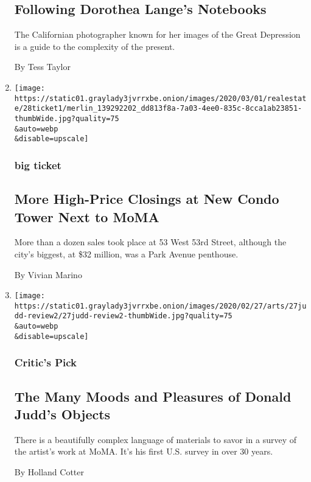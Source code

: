 \begin{enumerate}
  \hypertarget{following-dorothea-langes-notebooks}{%
  \subsection{Following Dorothea Lange's
  Notebooks}\label{following-dorothea-langes-notebooks}}

  The Californian photographer known for her images of the Great
  Depression is a guide to the complexity of the present.

  By Tess Taylor
\item
  \href{/2020/02/28/realestate/more-high-price-closings-at-new-condo-tower-next-to-moma.html}{}

  \texttt{[image: https://static01.graylady3jvrrxbe.onion/images/2020/03/01/realestate/28ticket1/merlin\_139292202\_dd813f8a-7a03-4ee0-835c-8cca1ab23851-thumbWide.jpg?quality=75\\\&auto=webp\\\&disable=upscale]}

  \hypertarget{big-ticket}{%
  \subsubsection{big ticket}\label{big-ticket}}

  \hypertarget{more-high-price-closings-at-new-condo-tower-next-to-moma}{%
  \subsection{More High-Price Closings at New Condo Tower Next to
  MoMA}\label{more-high-price-closings-at-new-condo-tower-next-to-moma}}

  More than a dozen sales took place at 53 West 53rd Street, although
  the city's biggest, at \$32 million, was a Park Avenue penthouse.

  By Vivian Marino
\item
  \href{/2020/02/27/arts/design/donald-judd-moma-review.html}{}

  \texttt{[image: https://static01.graylady3jvrrxbe.onion/images/2020/02/27/arts/27judd-review2/27judd-review2-thumbWide.jpg?quality=75\\\&auto=webp\\\&disable=upscale]}

  \hypertarget{critics-pick}{%
  \subsubsection{Critic's Pick}\label{critics-pick}}

  \hypertarget{the-many-moods-and-pleasures-of-donald-judds-objects}{%
  \subsection{The Many Moods and Pleasures of Donald Judd's
  Objects}\label{the-many-moods-and-pleasures-of-donald-judds-objects}}

  There is a beautifully complex language of materials to savor in a
  survey of the artist's work at MoMA. It's his first U.S. survey in
  over 30 years.

  By Holland Cotter
\end{enumerate}

